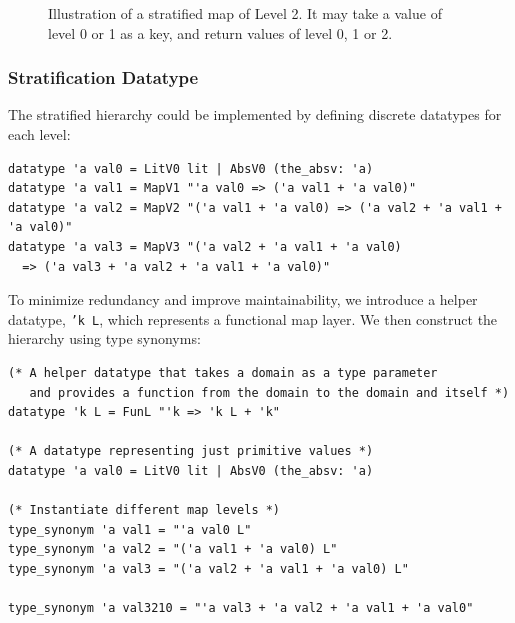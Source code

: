 \documentclass[11pt]{article}
\begin{document}
\begin{figure}[t]
  \centering
  \caption{Illustration of a stratified map of Level 2.
  It may take a value of level 0 or 1 as a key,
  and return values of level 0, 1 or 2.}
  \label{fig:stratified-map-hierarchy}
\end{figure}



\subsubsection{Stratification Datatype}
\label{sec:datatype-construction}
The stratified hierarchy could be implemented by defining discrete datatypes for each level:

\begin{verbatim}
datatype 'a val0 = LitV0 lit | AbsV0 (the_absv: 'a)
datatype 'a val1 = MapV1 "'a val0 => ('a val1 + 'a val0)"
datatype 'a val2 = MapV2 "('a val1 + 'a val0) => ('a val2 + 'a val1 + 'a val0)"
datatype 'a val3 = MapV3 "('a val2 + 'a val1 + 'a val0)
  => ('a val3 + 'a val2 + 'a val1 + 'a val0)"
\end{verbatim}

To minimize redundancy and improve maintainability, we introduce a helper datatype, \texttt{'k L},
which represents a functional map layer.
We then construct the hierarchy using type synonyms:

\begin{verbatim}
(* A helper datatype that takes a domain as a type parameter
   and provides a function from the domain to the domain and itself *)
datatype 'k L = FunL "'k => 'k L + 'k"

(* A datatype representing just primitive values *)
datatype 'a val0 = LitV0 lit | AbsV0 (the_absv: 'a)

(* Instantiate different map levels *)
type_synonym 'a val1 = "'a val0 L"
type_synonym 'a val2 = "('a val1 + 'a val0) L"
type_synonym 'a val3 = "('a val2 + 'a val1 + 'a val0) L"

type_synonym 'a val3210 = "'a val3 + 'a val2 + 'a val1 + 'a val0"
\end{verbatim}
\end{document}
